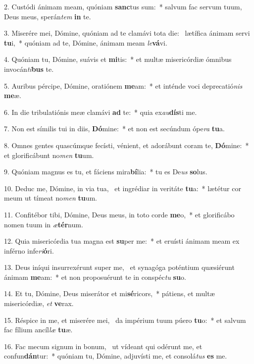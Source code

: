2. Custódi ánimam meam, quóniam \textbf{sanc}tus sum:~*  salvum fac servum tuum, Deus meus, sperán\textit{tem} \textbf{in} te.\

3. Miserére mei, Dómine, quóniam ad te clamávi tota die: \dag\  lætífica ánimam servi \textbf{tu}i,~*  quóniam ad te, Dómine, ánimam meam \textit{le}\textbf{vá}vi.\

4. Quóniam tu, Dómine, suávis et \textbf{mi}tis:~*  et multæ misericórdiæ ómnibus invocán\textit{ti}\textbf{bus} te.\

5. Auribus pércipe, Dómine, oratiónem \textbf{me}am:~*  et inténde voci deprecatió\textit{nis} \textbf{me}æ.\

6. In die tribulatiónis meæ clamávi \textbf{ad} te:~*  quia ex\textit{au}\textbf{dís}ti me.\

7. Non est símilis tui in diis, \textbf{Dó}mine:~*  et non est secúndum ópe\textit{ra} \textbf{tu}a.\

8. Omnes gentes quascúmque fecísti, vénient, et adorábunt coram te, \textbf{Dó}mine:~*  et glorificábunt no\textit{men} \textbf{tu}um.\

9. Quóniam magnus es tu, et fáciens mira\textbf{bí}lia:~*  tu es De\textit{us} \textbf{so}lus.\

10. Deduc me, Dómine, in via tua, \dag\  et ingrédiar in veritáte \textbf{tu}a:~*  lætétur cor meum ut tímeat no\textit{men} \textbf{tu}um.\

11. Confitébor tibi, Dómine, Deus meus, in toto corde \textbf{me}o,~*  et glorificábo nomen tuum in \textit{æ}\textbf{tér}num.\

12. Quia misericórdia tua magna est \textbf{su}per me:~*  et eruísti ánimam meam ex inférno infe\textit{ri}\textbf{ó}ri.\

13. Deus iníqui insurrexérunt super me, \dag\  et synagóga poténtium quæsiérunt ánimam \textbf{me}am:~*  et non proposuérunt te in conspéc\textit{tu} \textbf{su}o.\

14. Et tu, Dómine, Deus miserátor et mi\textbf{sé}ricors,~*  pátiens, et multæ misericórdiæ, \textit{et} \textbf{ve}rax.\

15. Réspice in me, et miserére mei, \dag\  da impérium tuum púero \textbf{tu}o:~*  et salvum fac fílium ancíl\textit{læ} \textbf{tu}æ.\

16. Fac mecum signum in bonum, \dag\  ut vídeant qui odérunt me, et confun\textbf{dán}tur:~*  quóniam tu, Dómine, adjuvísti me, et consolá\textit{tus} \textbf{es} me.\

